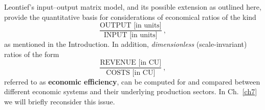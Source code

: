 \medskip
\noindent
Leontief's input--output matrix model, and its possible extension 
as outlined here, provide the quantitative basis for 
considerations of economical ratios of the kind
%
\[
\frac{\text{OUTPUT [in~$\text{units}$]}}{\text{INPUT 
[in~$\text{units}$]}} \ ,
\]
%
as mentioned in the Introduction. In addition, \emph{dimensionless}
(scale-invariant) ratios of the form
%
\[
\frac{\text{REVENUE [in~$\text{CU}$]}}{\text{COSTS 
[in~$\text{CU}$]}} \ ,
\]
%
%
referred to as {\bf economic efficiency}, can be computed for and 
compared between different economic systems and their underlying 
production sectors. In Ch.~\ref{ch7} we will briefly reconsider 
this issue.

